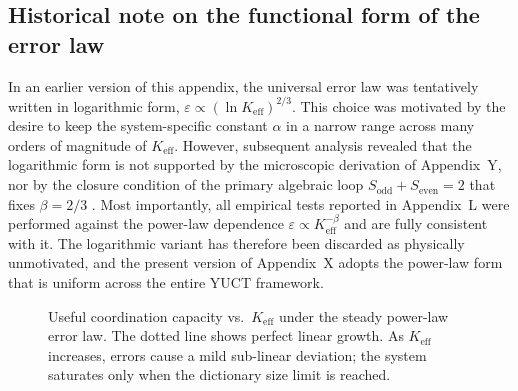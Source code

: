 \documentclass[12pt,a4paper]{article}
\theoremstyle{remark}
\begin{document}
	\subsection*{Historical note on the functional form of the error law}
	
	In an earlier version of this appendix, the universal error law was tentatively written
	in logarithmic form, \( \varepsilon \propto (\ln K_{\mathrm{eff}})^{2/3} \).
	This choice was motivated by the desire to keep the system-specific constant \(\alpha\) in a
	narrow range across many orders of magnitude of \(K_{\mathrm{eff}}\).  However, subsequent
	analysis revealed that the logarithmic form is not supported by the microscopic derivation
	of Appendix~Y, nor by the closure condition of the primary algebraic loop
	\(S_{\mathrm{odd}}+S_{\mathrm{even}}=2\) that fixes \(\beta=2/3\) \cite{YakushevLaw2026}.
	Most importantly, all empirical tests reported in Appendix~L were performed against the
	power-law dependence \(\varepsilon \propto K_{\mathrm{eff}}^{-\beta}\) and are fully consistent
	with it.  The logarithmic variant has therefore been discarded as physically unmotivated, and
	the present version of Appendix~X adopts the power-law form that is uniform across the entire
	YUCT framework.
	
	\begin{figure}[htbp]
		\centering
		\caption{Useful coordination capacity vs.\ \(K_{\mathrm{eff}}\) under the steady power-law error law. The dotted line shows perfect linear growth. As \(K_{\mathrm{eff}}\) increases, errors cause a mild sub-linear deviation; the system saturates only when the dictionary size limit is reached.}
		\label{fig:keff-phase}
	\end{figure}
	
\end{document}
